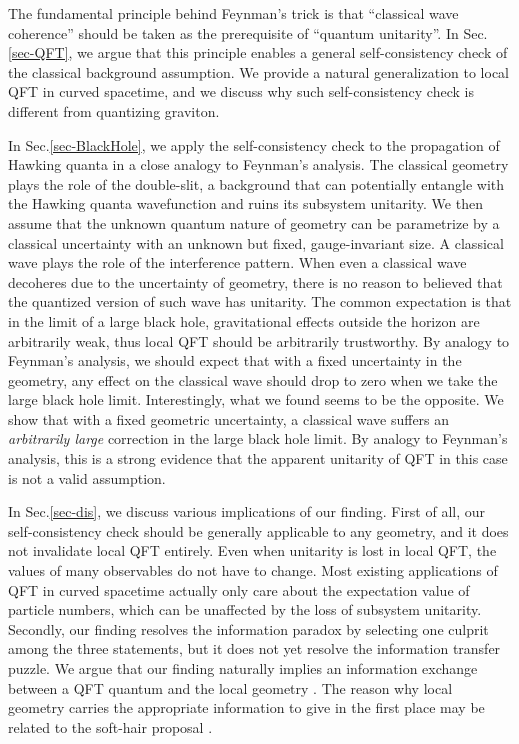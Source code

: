 \documentclass[aps,showpacs,twocolumn,floats,prd,superscriptaddress,nofootinbib]{revtex4-1}
\begin{document}
The fundamental principle behind Feynman's trick is that ``classical wave coherence'' should be taken as the prerequisite of ``quantum unitarity''. 
In Sec.\ref{sec-QFT}, we argue that this principle enables a general self-consistency check of the classical background assumption. 
We provide a natural generalization to local QFT in curved spacetime, and we discuss why such self-consistency check is different from quantizing graviton.

In Sec.\ref{sec-BlackHole}, we apply the self-consistency check to the propagation of Hawking quanta in a close analogy to Feynman's analysis. 
The classical geometry plays the role of the double-slit, a background that can potentially entangle with the Hawking quanta wavefunction and ruins its subsystem unitarity. 
We then assume that the unknown quantum nature of geometry can be parametrize by a classical uncertainty with an unknown but fixed, gauge-invariant size. 
A classical wave plays the role of the interference pattern. 
When even a classical wave decoheres due to the uncertainty of geometry, there is no reason to believed that the quantized version of such wave has unitarity.
The common expectation is that in the limit of a large black hole, gravitational effects outside the horizon are arbitrarily weak, thus local QFT should be arbitrarily trustworthy.
By analogy to Feynman's analysis, we should expect that with a fixed uncertainty in the geometry, any effect on the classical wave should drop to zero when we take the large black hole limit.
Interestingly, what we found seems to be the opposite. 
We show that with a fixed geometric uncertainty, a classical wave suffers an {\it arbitrarily large} correction in the large black hole limit.
By analogy to Feynman's analysis, this is a strong evidence that the apparent unitarity of QFT in this case is not a valid assumption.

In Sec.\ref{sec-dis}, we discuss various implications of our finding. 
First of all, our self-consistency check should be generally applicable to any geometry, and it does not invalidate local QFT entirely. 
Even when unitarity is lost in local QFT, the values of many observables do not have to change. 
Most existing applications of QFT in curved spacetime actually only care about the expectation value of particle numbers, which can be unaffected by the loss of subsystem unitarity. 
Secondly, our finding resolves the information paradox by selecting one culprit among the three statements, but it does not yet resolve the information transfer puzzle. 
We argue that our finding naturally implies an information exchange between a QFT quantum and the local geometry \cite{OsuPag16}.
The reason why local geometry carries the appropriate information to give in the first place may be related to the soft-hair proposal \cite{HawPer16}. 
\end{document}
